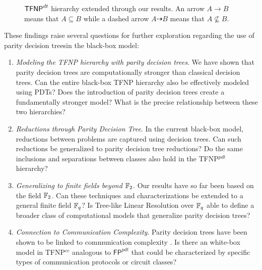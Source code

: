 \begin{figure}[H]

    
    \caption{$\mathsf{TFNP}^{dt}$ hierarchy extended through our results. An arrow $A \to B$ means that $A \subseteq B$ while a dashed arrow $A \dashrightarrow B$ means that $A \not\subseteq B$.}   
\end{figure} 

\noindent
These findings raise several questions for further exploration regarding the use of parity decision treesin the black-box model:
\begin{enumerate}
    \item \textit{Modeling the \textsf{TFNP} hierarchy with parity decision trees}. We have shown that parity decision trees are computationally stronger than classical decision trees. Can the entire black-box \textsf{TFNP} hierarchy also be effectively modeled using PDTs? Does the introduction of parity decision trees create a fundamentally stronger model? What is the precise relationship between these two hierarchies?
    \item \textit{Reductions through Parity Decision Tree}. In the current black-box model, reductions between problems are captured using decision trees. Can such reductions be generalized to parity decision tree reductions? Do the same inclusions and separations between classes also hold in the \textsf{TFNP}$^{pdt}$ hierarchy?
    \item \textit{Generalizing to finite fields beyond $\mathbb{F}_2$}. Our results have so far been based on the field $\mathbb{F}_2$. Can these techniques and characterizations be extended to a general finite field $\mathbb{F}_q$? Is Tree-like Linear Resolution over $\mathbb{F}_q$ able to define a broader class of computational models that generalize parity decision trees?
    \item \textit{Connection to Communication Complexity}. Parity decision trees have been shown to be linked to communication complexity  \cite{parity_complexity, pdts_comm_compl}. Is there an white-box model in \textsf{TFNP}$^{cc}$ analogous to $\textsf{FP}^{pdt}$ that could be characterized by specific types of communication protocols or circuit classes?

\end{enumerate}

